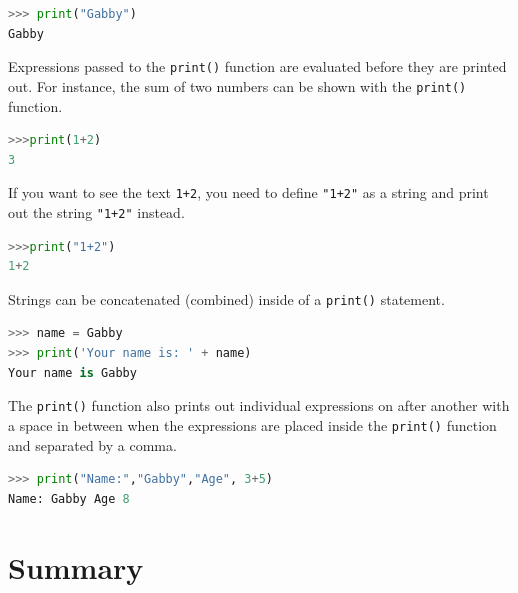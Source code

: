 \documentclass{book}
\begin{document}
\begin{lstlisting}[language=Python]
>>> print("Gabby")
Gabby
\end{lstlisting}
    




    
        Expressions passed to the \lstinline!print()! function are evaluated
before they are printed out. For instance, the sum of two numbers can be
shown with the \lstinline!print()! function.

\begin{lstlisting}[language=Python]
>>>print(1+2)
3
\end{lstlisting}

If you want to see the text \lstinline!1+2!, you need to define
\lstinline!"1+2"! as a string and print out the string \lstinline!"1+2"!
instead.

\begin{lstlisting}[language=Python]
>>>print("1+2")
1+2
\end{lstlisting}
    




    
        Strings can be concatenated (combined) inside of a \lstinline!print()!
statement.

\begin{lstlisting}[language=Python]
>>> name = Gabby
>>> print('Your name is: ' + name)
Your name is Gabby
\end{lstlisting}
    




    
        The \lstinline!print()! function also prints out individual expressions
on after another with a space in between when the expressions are placed
inside the \lstinline!print()! function and separated by a comma.

\begin{lstlisting}[language=Python]
>>> print("Name:","Gabby","Age", 3+5)
Name: Gabby Age 8
\end{lstlisting}
    




    
        \newpage
        \section{Summary}\label{summary}

    
\end{document}
